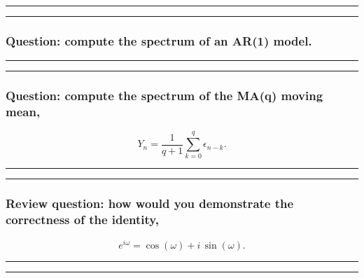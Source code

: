 \documentclass[]{article}
\begin{document}
\begin{center}\rule{0.5\linewidth}{\linethickness}\end{center}

\begin{center}\rule{0.5\linewidth}{\linethickness}\end{center}

\subsubsection{Question: compute the spectrum of an AR(1)
model.}\label{question-compute-the-spectrum-of-an-ar1-model.}

\begin{center}\rule{0.5\linewidth}{\linethickness}\end{center}

\begin{center}\rule{0.5\linewidth}{\linethickness}\end{center}

\subsubsection{Question: compute the spectrum of the MA(q) moving
mean,}\label{question-compute-the-spectrum-of-the-maq-moving-mean}

\[ Y_n = \frac{1}{q+1} \sum_{k=0}^q \epsilon_{n-k}.\]

\begin{center}\rule{0.5\linewidth}{\linethickness}\end{center}

\begin{center}\rule{0.5\linewidth}{\linethickness}\end{center}

\subsubsection{Review question: how would you demonstrate the
correctness of the
identity,}\label{review-question-how-would-you-demonstrate-the-correctness-of-the-identity}

\[ e^{i\omega} = \cos(\omega)+i\,\sin(\omega).\]

\begin{center}\rule{0.5\linewidth}{\linethickness}\end{center}

\begin{center}\rule{0.5\linewidth}{\linethickness}\end{center}
\end{document}
